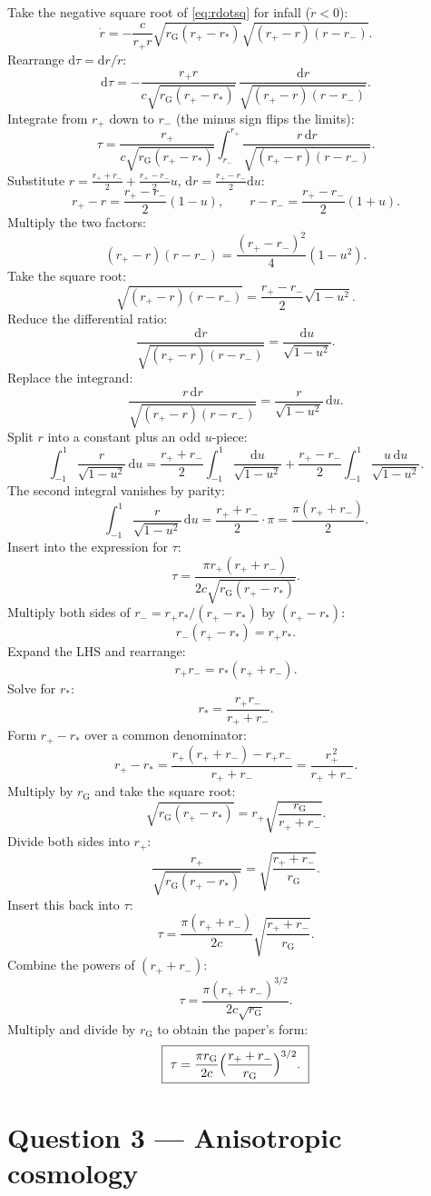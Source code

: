 \documentclass[11pt]{article}
\newcommand{\de}{\mathrm{d}}
\newcommand{\rG}{r_{\mathrm{G}}}
\begin{document}
Take the negative square root of \eqref{eq:rdotsq} for infall ($\dot r<0$):
\[
\dot r=-\frac{c}{r_+ r}\sqrt{\rG(r_+-r_*)}\sqrt{(r_+-r)(r-r_-)}.
\]
Rearrange $\de\tau=\de r/\dot r$:
\[
\de\tau=-\frac{r_+ r}{c\sqrt{\rG(r_+-r_*)}}\,\frac{\de r}{\sqrt{(r_+-r)(r-r_-)}}.
\]
Integrate from $r_+$ down to $r_-$ (the minus sign flips the limits):
\[
\tau=\frac{r_+}{c\sqrt{\rG(r_+-r_*)}}\int_{r_-}^{r_+}\frac{r\,\de r}{\sqrt{(r_+-r)(r-r_-)}}.
\]
Substitute $r=\tfrac{r_++r_-}{2}+\tfrac{r_+-r_-}{2}u$, $\de r=\tfrac{r_+-r_-}{2}\de u$:
\[
r_+-r=\frac{r_+-r_-}{2}(1-u),\qquad r-r_-=\frac{r_+-r_-}{2}(1+u).
\]
Multiply the two factors:
\[
(r_+-r)(r-r_-)=\frac{(r_+-r_-)^2}{4}(1-u^2).
\]
Take the square root:
\[
\sqrt{(r_+-r)(r-r_-)}=\frac{r_+-r_-}{2}\sqrt{1-u^2}.
\]
Reduce the differential ratio:
\[
\frac{\de r}{\sqrt{(r_+-r)(r-r_-)}}=\frac{\de u}{\sqrt{1-u^2}}.
\]
Replace the integrand:
\[
\frac{r\,\de r}{\sqrt{(r_+-r)(r-r_-)}}=\frac{r}{\sqrt{1-u^2}}\,\de u.
\]
Split $r$ into a constant plus an odd $u$-piece:
\[
\int_{-1}^{1}\frac{r}{\sqrt{1-u^2}}\,\de u=\frac{r_++r_-}{2}\int_{-1}^{1}\frac{\de u}{\sqrt{1-u^2}}+\frac{r_+-r_-}{2}\int_{-1}^{1}\frac{u\,\de u}{\sqrt{1-u^2}}.
\]
The second integral vanishes by parity:
\[
\int_{-1}^{1}\frac{r}{\sqrt{1-u^2}}\,\de u=\frac{r_++r_-}{2}\cdot\pi=\frac{\pi(r_++r_-)}{2}.
\]
Insert into the expression for $\tau$:
\[
\tau=\frac{\pi r_+(r_++r_-)}{2c\sqrt{\rG(r_+-r_*)}}.
\]
Multiply both sides of $r_-=r_+ r_*/(r_+-r_*)$ by $(r_+-r_*)$:
\[
r_-(r_+-r_*)=r_+ r_*.
\]
Expand the LHS and rearrange:
\[
r_+ r_-=r_*(r_++r_-).
\]
Solve for $r_*$:
\[
r_*=\frac{r_+ r_-}{r_++r_-}.
\]
Form $r_+-r_*$ over a common denominator:
\[
r_+-r_*=\frac{r_+(r_++r_-)-r_+r_-}{r_++r_-}=\frac{r_+^{\,2}}{r_++r_-}.
\]
Multiply by $\rG$ and take the square root:
\[
\sqrt{\rG(r_+-r_*)}=r_+\sqrt{\frac{\rG}{r_++r_-}}.
\]
Divide both sides into $r_+$:
\[
\frac{r_+}{\sqrt{\rG(r_+-r_*)}}=\sqrt{\frac{r_++r_-}{\rG}}.
\]
Insert this back into $\tau$:
\[
\tau=\frac{\pi(r_++r_-)}{2c}\sqrt{\frac{r_++r_-}{\rG}}.
\]
Combine the powers of $(r_++r_-)$:
\[
\tau=\frac{\pi(r_++r_-)^{3/2}}{2c\sqrt{\rG}}.
\]
Multiply and divide by $\rG$ to obtain the paper's form:
\begin{equation}
\boxed{\ \tau=\frac{\pi\rG}{2c}\Bigl(\frac{r_++r_-}{\rG}\Bigr)^{3/2}.\ }
\label{eq:taubox}
\end{equation}

\section*{Question 3 --- Anisotropic cosmology}
\end{document}

